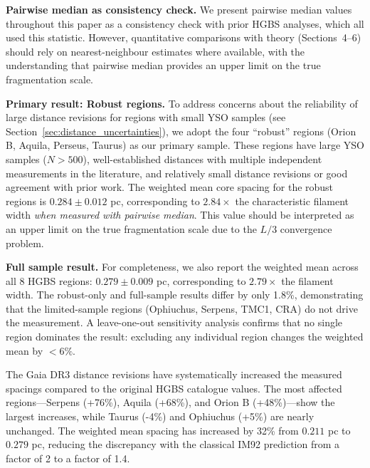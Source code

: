 \documentclass[twocolumn]{mnras}
\begin{document}
\textbf{Pairwise median as consistency check.}
We present pairwise median values throughout this paper as a consistency check with prior HGBS analyses, which all used this statistic. However, quantitative comparisons with theory (Sections~4--6) should rely on nearest-neighbour estimates where available, with the understanding that pairwise median provides an upper limit on the true fragmentation scale.

\textbf{Primary result: Robust regions.}
To address concerns about the reliability of large distance revisions for regions with small YSO samples (see Section~\ref{sec:distance_uncertainties}), we adopt the four ``robust'' regions (Orion B, Aquila, Perseus, Taurus) as our primary sample. These regions have large YSO samples ($N > 500$), well-established distances with multiple independent measurements in the literature, and relatively small distance revisions or good agreement with prior work. The weighted mean core spacing for the robust regions is $0.284 \pm 0.012$ pc, corresponding to $2.84\times$ the characteristic filament width \textit{when measured with pairwise median}. This value should be interpreted as an upper limit on the true fragmentation scale due to the $L/3$ convergence problem.

\textbf{Full sample result.} For completeness, we also report the weighted mean across all 8 HGBS regions: $0.279 \pm 0.009$ pc, corresponding to $2.79\times$ the filament width. The robust-only and full-sample results differ by only 1.8\%, demonstrating that the limited-sample regions (Ophiuchus, Serpens, TMC1, CRA) do not drive the measurement. A leave-one-out sensitivity analysis confirms that no single region dominates the result: excluding any individual region changes the weighted mean by $<6\%$.

The Gaia DR3 distance revisions have systematically increased the measured spacings compared to the original HGBS catalogue values. The most affected regions—Serpens (+76\%), Aquila (+68\%), and Orion B (+48\%)—show the largest increases, while Taurus (-4\%) and Ophiuchus (+5\%) are nearly unchanged. The weighted mean spacing has increased by 32\% from $0.211$ pc to $0.279$ pc, reducing the discrepancy with the classical IM92 prediction from a factor of 2 to a factor of 1.4.
\end{document}
